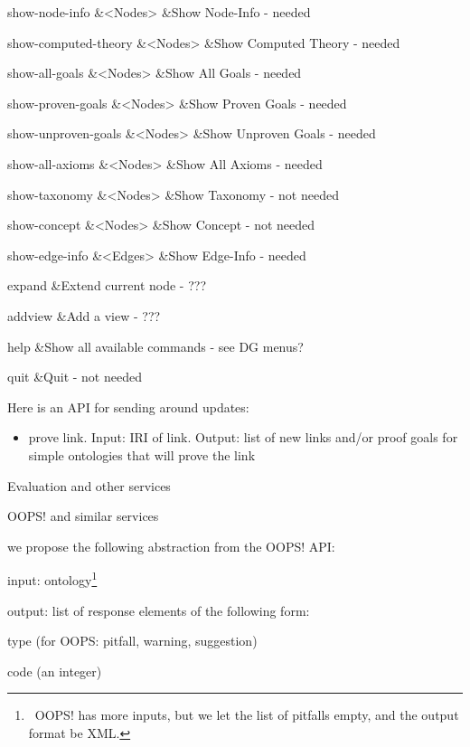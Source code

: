 \documentclass{article}
\begin{document}
show-node-info &{\textless}Nodes{\textgreater}
&Show Node-Info - needed

show-computed-theory &{\textless}Nodes{\textgreater}
&Show Computed Theory - needed

show-all-goals &{\textless}Nodes{\textgreater}
&Show All Goals - needed

show-proven-goals &{\textless}Nodes{\textgreater}
&Show Proven Goals - needed

show-unproven-goals &{\textless}Nodes{\textgreater}
&Show Unproven Goals - needed

show-all-axioms &{\textless}Nodes{\textgreater}
&Show All Axioms - needed

show-taxonomy &{\textless}Nodes{\textgreater}
&Show Taxonomy - not needed

show-concept &{\textless}Nodes{\textgreater}
&Show Concept - not needed

show-edge-info &{\textless}Edges{\textgreater}
&Show Edge-Info - needed

expand
&Extend
current node - ???

addview
&Add a
view - ???

help
&Show
all available commands - see DG menus?

quit
&Quit
- not needed


\bigskip


\bigskip

Here is an API for sending around updates:

\begin{itemize}
\item prove link. Input: IRI of link. Output: list of new links and/or
proof goals for simple ontologies that will prove the link
\end{itemize}

\bigskip


\bigskip


\bigskip

Evaluation and other services

OOPS! and similar services

we propose the following abstraction from the OOPS! API:

input: ontology\footnote{\ OOPS! has more inputs, but we let the list of
pitfalls empty, and the output format be XML.}

output: list of response elements of the following form:

type (for OOPS: pitfall, warning, suggestion)

code (an integer)
\end{document}
